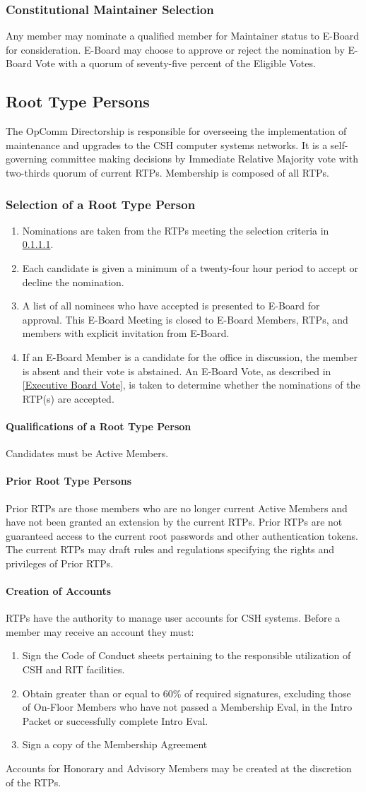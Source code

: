 \documentclass{article}
\newcommand{\asection}[1]{\subsection{#1} \label{#1}}
\newcommand{\asubsection}[1]{\subsubsection{#1} \label{#1}}
\newcommand{\asubsubsection}[1]{\paragraph{#1} \label{#1}}
\begin{document}
\asubsection{Constitutional Maintainer Selection}
Any member may nominate a qualified member for Maintainer status to E-Board for consideration.
E-Board may choose to approve or reject the nomination by E-Board Vote with a quorum of seventy-five percent of the Eligible Votes.

\asection{Root Type Persons}
The OpComm Directorship is responsible for overseeing the implementation of maintenance and upgrades to the CSH computer systems networks.
It is a self-governing committee making decisions by Immediate Relative Majority vote with two-thirds quorum of current RTPs.
Membership is composed of all RTPs.

\asubsection{Selection of a Root Type Person}
\renewcommand{\theenumi}{\alph{enumi}} %
\begin{enumerate}
	\item Nominations are taken from the RTPs meeting the selection criteria in \ref{Qualifications of a Root Type Person}.
	\item Each candidate is given a minimum of a twenty-four hour period to accept or decline the nomination.
	\item A list of all nominees who have accepted is presented to E-Board for approval.
	      This E-Board Meeting is closed to E-Board Members, RTPs, and members with explicit invitation from E-Board.
	\item If an E-Board Member is a candidate for the office in discussion, the member is absent and their vote is abstained.
	      An E-Board Vote, as described in \ref{Executive Board Vote}, is taken to determine whether the nominations of the RTP(s) are accepted.
\end{enumerate}

\asubsubsection{Qualifications of a Root Type Person}
Candidates must be Active Members.

\asubsubsection{Prior Root Type Persons}
Prior RTPs are those members who are no longer current Active Members and have not been granted an extension by the current RTPs.
Prior RTPs are not guaranteed access to the current root passwords and other authentication tokens.
The current RTPs may draft rules and regulations specifying the rights and privileges of Prior RTPs.

\asubsubsection{Creation of Accounts}
RTPs have the authority to manage user accounts for CSH systems.
Before a member may receive an account they must:
\renewcommand{\theenumi}{\arabic{enumi}} %
\begin{enumerate}
	\item Sign the Code of Conduct sheets pertaining to the responsible utilization of CSH and RIT facilities.
	\item Obtain greater than or equal to 60\% of required signatures, excluding those of On-Floor Members who have not passed a Membership Eval, in the Intro Packet or successfully complete Intro Eval.
	\item Sign a copy of the Membership Agreement
\end{enumerate}
Accounts for Honorary and Advisory Members may be created at the discretion of the RTPs.
\end{document}
